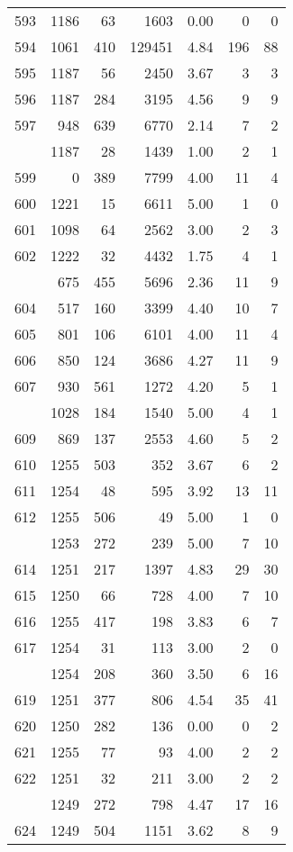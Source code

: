 \documentclass[
]{article}
\begin{document}
\begin{table}
\begin{tabular}[t]{lrrrrrr}
593 & 1186 & 63 & 1603 & 0.00 & 0 & 0\\
594 & 1061 & 410 & 129451 & 4.84 & 196 & 88\\
595 & 1187 & 56 & 2450 & 3.67 & 3 & 3\\
596 & 1187 & 284 & 3195 & 4.56 & 9 & 9\\
597 & 948 & 639 & 6770 & 2.14 & 7 & 2\\
\addlinespace
598 & 1187 & 28 & 1439 & 1.00 & 2 & 1\\
599 & 0 & 389 & 7799 & 4.00 & 11 & 4\\
600 & 1221 & 15 & 6611 & 5.00 & 1 & 0\\
601 & 1098 & 64 & 2562 & 3.00 & 2 & 3\\
602 & 1222 & 32 & 4432 & 1.75 & 4 & 1\\
\addlinespace
603 & 675 & 455 & 5696 & 2.36 & 11 & 9\\
604 & 517 & 160 & 3399 & 4.40 & 10 & 7\\
605 & 801 & 106 & 6101 & 4.00 & 11 & 4\\
606 & 850 & 124 & 3686 & 4.27 & 11 & 9\\
607 & 930 & 561 & 1272 & 4.20 & 5 & 1\\
\addlinespace
608 & 1028 & 184 & 1540 & 5.00 & 4 & 1\\
609 & 869 & 137 & 2553 & 4.60 & 5 & 2\\
610 & 1255 & 503 & 352 & 3.67 & 6 & 2\\
611 & 1254 & 48 & 595 & 3.92 & 13 & 11\\
612 & 1255 & 506 & 49 & 5.00 & 1 & 0\\
\addlinespace
613 & 1253 & 272 & 239 & 5.00 & 7 & 10\\
614 & 1251 & 217 & 1397 & 4.83 & 29 & 30\\
615 & 1250 & 66 & 728 & 4.00 & 7 & 10\\
616 & 1255 & 417 & 198 & 3.83 & 6 & 7\\
617 & 1254 & 31 & 113 & 3.00 & 2 & 0\\
\addlinespace
618 & 1254 & 208 & 360 & 3.50 & 6 & 16\\
619 & 1251 & 377 & 806 & 4.54 & 35 & 41\\
620 & 1250 & 282 & 136 & 0.00 & 0 & 2\\
621 & 1255 & 77 & 93 & 4.00 & 2 & 2\\
622 & 1251 & 32 & 211 & 3.00 & 2 & 2\\
\addlinespace
623 & 1249 & 272 & 798 & 4.47 & 17 & 16\\
624 & 1249 & 504 & 1151 & 3.62 & 8 & 9\\

\end{tabular}
\end{table}
\end{document}
